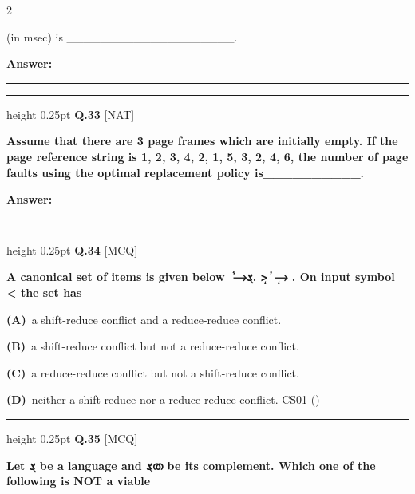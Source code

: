 \documentclass[a4paper,10pt,twoside]{article}
\begin{document}
\begin{multicols}{2}
{(in msec) is \_\_\_\_\_\_\_\_\_\_\_\_\_\_\_\_\_\_\_\_. \par}
\par\vspace{3pt}\noindent\textbf{Answer:} \rule{3.2cm}{0.4pt}
\par\vspace{6pt}\hrule height 0.25pt\vspace{6pt}
\noindent\textbf{Q.33} \hfill {\footnotesize\textsf{[NAT]}}
\par\vspace{2pt}
{\bfseries Assume that there are 3 page frames which are initially empty. If the page reference string is 1, 2, 3,
4, 2, 1, 5, 3, 2, 4, 6, the number of page faults using the optimal replacement policy is\_\_\_\_\_\_\_\_\_\_. \par}
\par\vspace{3pt}\noindent\textbf{Answer:} \rule{3.2cm}{0.4pt}
\par\vspace{6pt}\hrule height 0.25pt\vspace{6pt}
\noindent\textbf{Q.34} \hfill {\footnotesize\textsf{[MCQ]}}
\par\vspace{2pt}
{\bfseries A canonical set of items is given below ܵ
⟶ܮ. >ܴ
ܳ
⟶ܴ
.
On input symbol < the set has \par}
\par\vspace{2pt}\noindent
\textbf{(A)}~a shift-reduce conflict and a reduce-reduce conflict.\par\vspace{2pt}\noindent
\textbf{(B)}~a shift-reduce conflict but not a reduce-reduce conflict.\par\vspace{2pt}\noindent
\textbf{(C)}~a reduce-reduce conflict but not a shift-reduce conflict.\par\vspace{2pt}\noindent
\textbf{(D)}~neither a shift-reduce nor a reduce-reduce conflict. \newline CS01 ()
\par\vspace{6pt}\hrule height 0.25pt\vspace{6pt}
\noindent\textbf{Q.35} \hfill {\footnotesize\textsf{[MCQ]}}
\par\vspace{2pt}
{\bfseries Let ܮ be a language and ܮത be its complement. Which one of the following is NOT a viable
}
\end{multicols}
\end{document}
